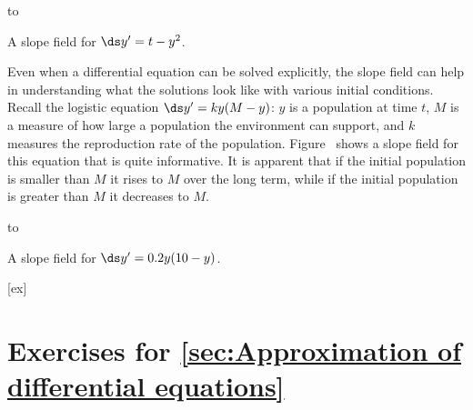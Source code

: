 \figure[H]
\hbox to 
\caption{\label{fig:slope field}
A slope field for $\ds y'=t-y^2$.}
\endfigure

Even when a differential equation can be solved explicitly, the slope
field can help in understanding what the solutions look like with
various initial conditions. Recall the logistic equation 
$\ds y' = ky(M-y)$: $y$ is a population at time $t$, $M$ is a measure of how
large a population the environment can support, and $k$ measures the
reproduction rate of the population.
Figure~ shows a slope field
for this equation that is quite informative. 
It is apparent that if the initial population is smaller than $M$ it
rises to $M$ over the long term, while if the initial population is
greater than $M$ it decreases to $M$.

\figure[H]
\hbox to 
\caption{\label{fig:logistic slope field}
A slope field for $\ds y'=0.2y(10-y)$.}
\endfigure


[ex]
\section*{Exercises for \ref{sec:Approximation of differential equations}}

